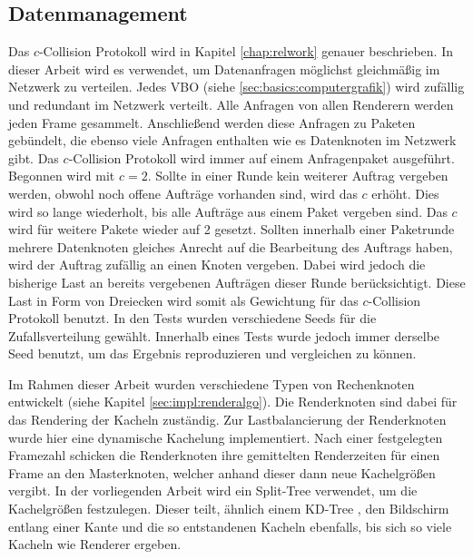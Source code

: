 \subsection{Datenmanagement}
\label{sec:basics:daten}
Das $c$-Collision Protokoll wird in Kapitel \ref{chap:relwork} genauer beschrieben. In dieser Arbeit wird es verwendet, um Datenanfragen möglichst gleichmäßig im Netzwerk zu verteilen. Jedes VBO (siehe \ref{sec:basics:computergrafik}) wird zufällig und redundant im Netzwerk verteilt. Alle Anfragen von allen Renderern werden jeden Frame gesammelt. Anschließend werden diese Anfragen zu Paketen gebündelt, die ebenso viele Anfragen enthalten wie es Datenknoten im Netzwerk gibt. Das $c$-Collision Protokoll wird immer auf einem Anfragenpaket ausgeführt. Begonnen wird mit $c = 2$. Sollte in einer Runde kein weiterer Auftrag vergeben werden, obwohl noch offene Aufträge vorhanden sind, wird das $c$ erhöht. Dies wird so lange wiederholt, bis alle Aufträge aus einem Paket vergeben sind. Das $c$ wird für weitere Pakete wieder auf 2 gesetzt. Sollten innerhalb einer Paketrunde mehrere Datenknoten gleiches Anrecht auf die Bearbeitung des Auftrags haben, wird der Auftrag zufällig an einen Knoten vergeben. Dabei wird jedoch die bisherige Last an bereits vergebenen Aufträgen dieser Runde berücksichtigt. Diese Last in Form von Dreiecken wird somit als Gewichtung für das $c$-Collision Protokoll benutzt. In den Tests wurden verschiedene Seeds für die Zufallsverteilung gewählt. Innerhalb eines Tests wurde jedoch immer derselbe Seed benutzt, um das Ergebnis reproduzieren und vergleichen zu können.

Im Rahmen dieser Arbeit wurden verschiedene Typen von Rechenknoten entwickelt (siehe Kapitel \ref{sec:impl:renderalgo}). Die Renderknoten sind dabei für das Rendering der Kacheln zuständig. Zur Lastbalancierung der Renderknoten wurde hier eine dynamische Kachelung implementiert. Nach einer festgelegten Framezahl schicken die Renderknoten ihre gemittelten Renderzeiten für einen Frame an den Masterknoten, welcher anhand dieser dann neue Kachelgrößen vergibt. In der vorliegenden Arbeit wird ein Split-Tree verwendet, um die Kachelgrößen festzulegen. Dieser teilt, ähnlich einem KD-Tree \cite{RTR3}, den Bildschirm entlang einer Kante und die so entstandenen Kacheln ebenfalls, bis sich so viele Kacheln wie Renderer ergeben. 


